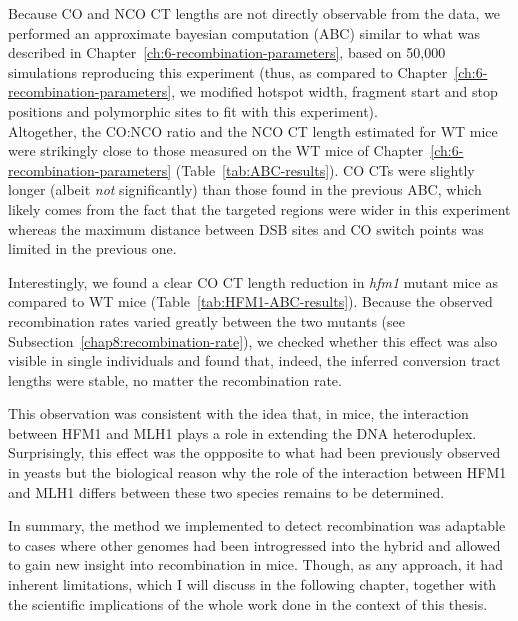 Because CO and NCO CT lengths are not directly observable from the data, we performed an approximate bayesian computation (ABC) similar to what was described in Chapter~\ref{ch:6-recombination-parameters}, based on 50,000 simulations reproducing this experiment (thus, as compared to Chapter~\ref{ch:6-recombination-parameters}, we modified hotspot width, fragment start and stop positions and polymorphic sites to fit with this experiment).\\




Altogether, the CO:NCO ratio and the NCO CT length estimated for WT mice were strikingly close to those measured on the WT mice of Chapter~\ref{ch:6-recombination-parameters} (Table~\ref{tab:ABC-results}).
CO CTs were slightly longer (albeit \textit{not} significantly) than those found in the previous ABC, which likely comes from the fact that the targeted regions were wider in this experiment whereas the maximum distance between DSB sites and CO switch points was limited in the previous one.

Interestingly, we found a clear CO CT length reduction in \textit{hfm1} mutant mice as compared to WT mice (Table~\ref{tab:HFM1-ABC-results}).
Because the observed recombination rates varied greatly between the two mutants (see Subsection~\ref{chap8:recombination-rate}), we checked whether this effect was also visible in single individuals and found that, indeed, the inferred conversion tract lengths were stable, no matter the recombination rate.
\begin{mccorrection}
This observation was consistent with the idea that, in mice, the interaction between HFM1 and MLH1 plays a role in extending the DNA heteroduplex.
Surprisingly, this effect was the oppposite to what had been previously observed in yeasts \citep{duroc2017concerted} but the biological reason why the role of the interaction between HFM1 and MLH1 differs between these two species remains to be determined.\\
\end{mccorrection}


In summary, the method we implemented to detect recombination was adaptable to cases where other genomes had been introgressed into the hybrid and allowed to gain new insight into recombination in mice.
Though, as any approach, it had inherent limitations, which I will discuss in the following chapter, together with the scientific implications of the whole work done in the context of this thesis.




